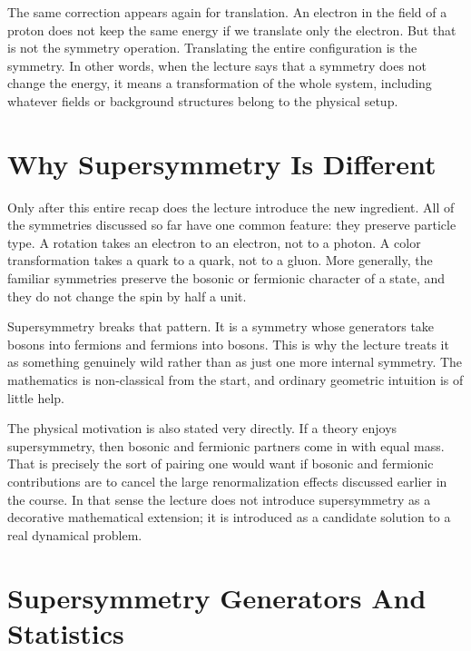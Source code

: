 The same correction appears again for translation. An electron in the field of a proton does not keep the same energy if we translate only the electron. But that is not the symmetry operation. Translating the entire configuration is the symmetry. In other words, when the lecture says that a symmetry does not change the energy, it means a transformation of the whole system, including whatever fields or background structures belong to the physical setup.

\section{Why Supersymmetry Is Different}

Only after this entire recap does the lecture introduce the new ingredient. All of the symmetries discussed so far have one common feature: they preserve particle type. A rotation takes an electron to an electron, not to a photon. A color transformation takes a quark to a quark, not to a gluon. More generally, the familiar symmetries preserve the bosonic or fermionic character of a state, and they do not change the spin by half a unit.

Supersymmetry breaks that pattern. It is a symmetry whose generators take bosons into fermions and fermions into bosons. This is why the lecture treats it as something genuinely wild rather than as just one more internal symmetry. The mathematics is non-classical from the start, and ordinary geometric intuition is of little help.

The physical motivation is also stated very directly. If a theory enjoys supersymmetry, then bosonic and fermionic partners come in with equal mass. That is precisely the sort of pairing one would want if bosonic and fermionic contributions are to cancel the large renormalization effects discussed earlier in the course. In that sense the lecture does not introduce supersymmetry as a decorative mathematical extension; it is introduced as a candidate solution to a real dynamical problem.

\section{Supersymmetry Generators And Statistics}

